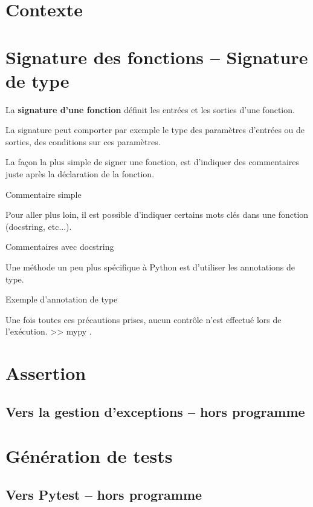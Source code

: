 \section{Contexte}

\section{Signature des fonctions -- Signature de type}
\begin{defi}
La \textbf{signature d'une fonction} définit les entrées et les sorties d'une fonction. 
\end{defi}


La signature peut comporter par exemple le type  des paramètres d'entrées ou de sorties, des conditions sur ces paramètres. 

La façon la plus simple de signer une fonction, est d'indiquer des commentaires juste après la déclaration de la fonction. 

\begin{exemple}
Commentaire simple
\end{exemple}


Pour aller plus loin, il est possible d'indiquer certains mots clés dans une fonction (docstring, etc...).

\begin{exemple}
Commentaires avec docstring
\end{exemple}

Une méthode un peu plus spécifique à Python est d'utiliser les annotations de type. 

\begin{exemple}
Exemple d'annotation de type
\end{exemple}


Une fois toutes ces précautions prises, aucun contrôle n'est effectué lors de l'exécution. >> mypy .

\section{Assertion}

\subsection{Vers la gestion d'exceptions -- hors programme}


\section{Génération de tests}


\subsection{Vers Pytest -- hors programme}


